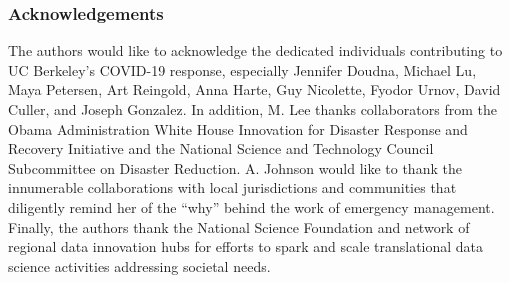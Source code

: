 \subsubsection*{Acknowledgements} The authors would like to acknowledge the dedicated individuals contributing to UC Berkeley’s COVID-19 response, especially Jennifer Doudna, Michael Lu, Maya Petersen, Art Reingold, Anna Harte, Guy Nicolette, Fyodor Urnov, David Culler, and Joseph Gonzalez.  In addition, M. Lee thanks collaborators from the Obama Administration White House Innovation for Disaster Response and Recovery Initiative and the National Science and Technology Council Subcommittee on Disaster Reduction. A. Johnson would like to thank the innumerable collaborations with local jurisdictions and communities that diligently remind her of the “why” behind the work of emergency management. Finally, the authors thank the National Science Foundation and network of regional data innovation hubs for efforts to spark and scale translational data science activities addressing societal needs. 
